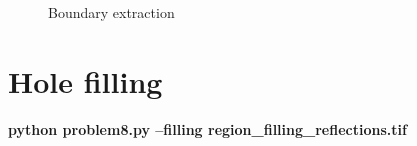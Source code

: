 \begin{figure}[!htb]
\begin{minipage}{0.45\textwidth}
        \caption{\small{Boundary extraction}}\label{diagram:boundary}
    \end{minipage}
\end{figure}


\section{Hole filling}

\textbf{python problem8.py --filling region\_filling\_reflections.tif}

